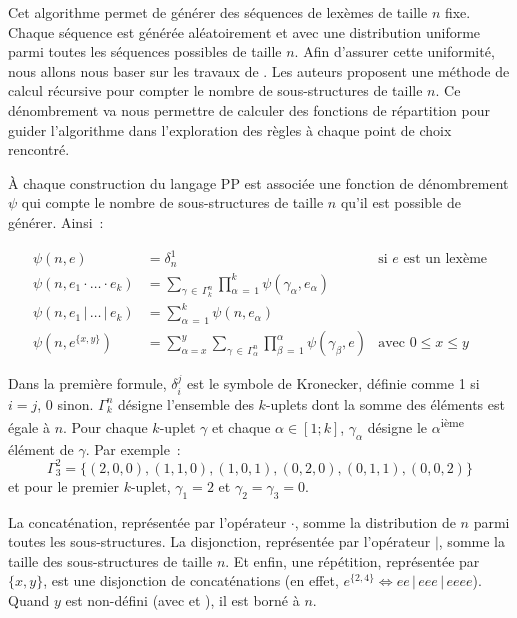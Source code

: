 Cet algorithme permet de générer des séquences de lexèmes de taille $n$ fixe.
Chaque séquence est générée aléatoirement et avec une distribution uniforme
parmi toutes les séquences possibles de taille $n$. Afin d'assurer cette
uniformité, nous allons nous baser sur les travaux de . Les
auteurs proposent une méthode de calcul récursive pour compter le nombre de
sous-structures de taille $n$. Ce dénombrement va nous permettre de calculer des
fonctions de répartition pour guider l'algorithme dans l'exploration des règles
à chaque point de choix rencontré.

À chaque construction du langage PP est associée une fonction de dénombrement
$\psi$ qui compte le nombre de sous-structures de taille $n$ qu'il est possible
de générer. Ainsi~:

\begin{align*}
%
\psi(n, e) & =
    \delta_n^1
    &
    \text{si $e$ est un lexème}
    \\
%
\psi(n, e_1 \cdot \dotso \cdot e_k) & =
    \sum_{\gamma \,\in\, \Gamma_k^n}
    \prod_{\alpha \,=\, 1}^k
    \psi(\gamma_\alpha, e_\alpha)
    \\
%
\psi(n, e_1 \,\vert\, \dots \,\vert\, e_k) & =
    \sum_{\alpha \,=\, 1}^k
    \psi(n, e_\alpha)
    \\
%
\psi(n, e^{\{x, y\}}) & =
    \sum_{\alpha = x}^y
    \sum_{\gamma \,\in\, \Gamma_\alpha^n}
    \prod_{\beta \,=\, 1}^\alpha
    \psi(\gamma_\beta, e)
    &
    \text{avec $0 \leq x \leq y$}
%
\end{align*}

Dans la première formule, $\delta_i^j$ est le symbole de Kronecker, définie
comme 1 si $i = j$, 0 sinon. $\Gamma_k^n$ désigne l'ensemble des $k$-uplets dont
la somme des éléments est égale à $n$. Pour chaque $k$-uplet $\gamma$ et chaque
$\alpha \in [1; k]$, $\gamma_\alpha$ désigne le $\alpha$\textsuperscript{ième}
élément de $\gamma$.
%
Par exemple~:
%
$$\Gamma_3^2 = \{(2, 0, 0), (1, 1, 0), (1, 0, 1), (0, 2, 0), (0, 1, 1), (0, 0,
2)\}$$
%
et pour le premier $k$-uplet, $\gamma_1 = 2$ et $\gamma_2 = \gamma_3 = 0$.

La concaténation, représentée par l'opérateur $\cdot$, somme la distribution de
$n$ parmi toutes les sous-structures. La disjonction, représentée par
l'opérateur $\vert$, somme la taille des sous-structures de taille $n$. Et
enfin, une répétition, représentée par $\{x, y\}$, est une disjonction de
concaténations (en effet, $e^{\{2,4\}} \Longleftrightarrow ee \,\vert\, eee
\,\vert\, eeee$). Quand $y$ est non-défini (avec \code{*} et \code{+}), il est
borné à $n$.

